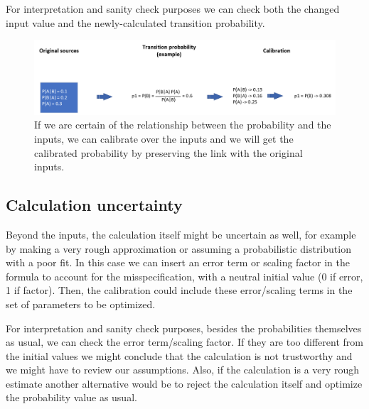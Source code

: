 For interpretation and sanity check purposes we can check both the changed input value and the newly-calculated transition probability.

\begin{figure}[h!]
	\centering
	\includegraphics[width=\textwidth]{figures/calibration_values}
	\decoRule
	\caption[Calibration over input values]{If we are certain of the relationship between the probability and the inputs, we can calibrate over the inputs and we will get the calibrated probability by preserving the link with the original inputs.}
	\label{fig:calibration_values}
\end{figure}

\subsection{Calculation uncertainty}
Beyond the inputs, the calculation itself might be uncertain as well, for example by making a very rough approximation or assuming a probabilistic distribution with a poor fit. In this case we can insert an error term or scaling factor in the formula to account for the misspecification, with a neutral initial value (0 if error, 1 if factor). Then, the calibration could include these error/scaling terms in the set of parameters to be optimized.

For interpretation and sanity check purposes, besides the probabilities themselves as usual, we can check the error term/scaling factor. If they are too different from the initial values we might conclude that the calculation is not trustworthy and we might have to review our assumptions. Also, if the calculation is a very rough estimate another alternative would be to reject the calculation itself and optimize the probability value as usual.

